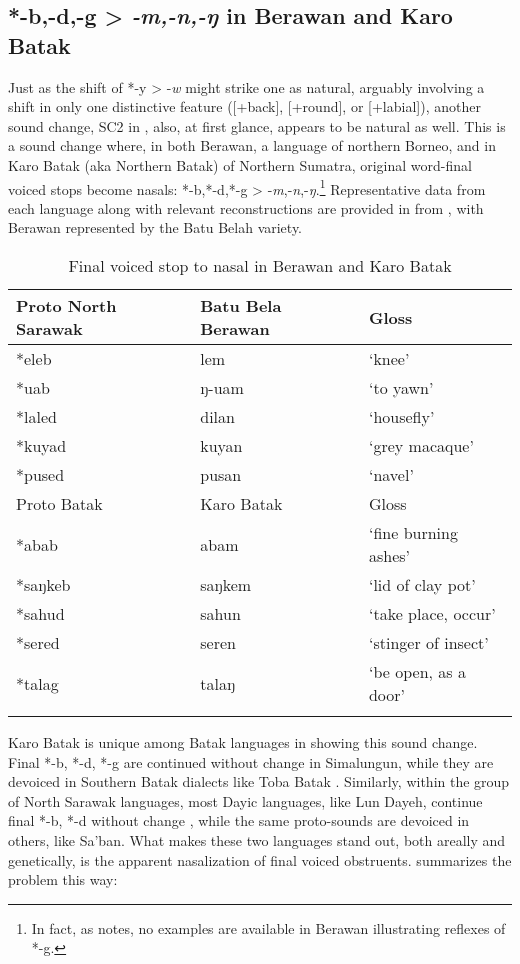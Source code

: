 \documentclass[output=paper]{langscibook}
\begin{document}
\subsection{*-b,-d,-g > \textit{-m,-n,-ŋ} in Berawan and Karo Batak}\label{sec:blevins:2.2}
Just as the shift of *-y > -\textit{w} might strike one as natural, arguably involving a shift in only one distinctive feature ([+back], [+round], or [+labial]), another sound change, SC2 in , also, at first glance, appears to be natural as well. This is a sound change where, in both Berawan, a language of northern Borneo, and in Karo Batak (aka Northern Batak) of Northern Sumatra, original word-final voiced stops become nasals:  *-b,*-d,*-g > -\textit{m},-\textit{n},-\textit{ŋ}.\footnote{In fact, as \textcite[249, 250]{Blust2005} notes, no examples are available in Berawan illustrating reflexes of *-g.}  Representative data from each language along with relevant reconstructions are provided in  from \citet[248--251]{Blust2005}, with Berawan represented by the Batu Belah variety.

\begin{table}
\begin{tabularx}{\textwidth}{XXl}
\lsptoprule
 {Proto}  {North}  {Sarawak} &  {Batu Bela Berawan} &  {Gloss}\\
 \midrule
*eleb & lem    & `knee'\\
*uab & ŋ-uam   & `to yawn'\\
*laled & dilan & `housefly'\\
*kuyad & kuyan & `grey macaque'\\
*pused & pusan & `navel'\\
\midrule
{Proto} {Batak} & {Karo} {Batak} & Gloss\\
\midrule
*abab & abam     & `fine burning ashes'\\
*saŋkeb & saŋkem & `lid of clay pot'\\
*sahud & sahun   & `take place, occur'\\
*sered & seren   & `stinger of insect'\\
*talag & talaŋ   & `be open, as a door'\\
\lspbottomrule
\end{tabularx}
\caption{\label{tab:blevins:4}Final voiced stop to nasal in Berawan and Karo Batak \citep[248--249]{Blust2005}}
\end{table}

Karo Batak is unique among Batak languages in showing this sound change. Final *-b, *-d, *-g are continued without change in Simalungun, while they are devoiced in Southern Batak dialects like Toba Batak \citep{Adelaar1981}. Similarly, within the group of North Sarawak languages, most Dayic languages, like Lun Dayeh, continue final *-b, *-d without change \citep[235]{Smith2017}, while the same proto-sounds are devoiced in others, like Sa’ban. What makes these two languages stand out, both areally and genetically, is the apparent nasalization of final voiced obstruents. \citet[249--251]{Blust2005} summarizes the problem this way:
\end{document}
